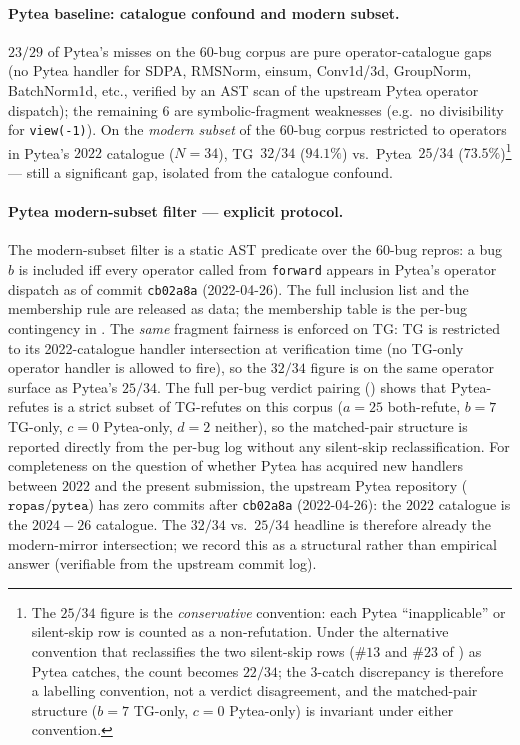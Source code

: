 \paragraph{Pytea baseline: catalogue confound and modern subset.}
$23/29$ of Pytea's misses on the $60$-bug corpus are pure
operator-catalogue gaps (no Pytea handler for SDPA, RMSNorm,
einsum, Conv1d/3d, GroupNorm, BatchNorm1d, etc., verified by an
AST scan of the upstream Pytea operator dispatch); the
remaining $6$ are symbolic-fragment weaknesses (e.g.\ no
divisibility for \texttt{view(-1)}). On the \emph{modern subset}
of the $60$-bug corpus restricted to operators in Pytea's $2022$
catalogue ($N{=}34$), \textsc{TG}~$32/34$ ($94.1\%$) vs.\
Pytea~$25/34$ ($73.5\%$)\footnote{The $25/34$ figure is the
\emph{conservative} convention: each Pytea ``inapplicable''
or silent-skip row is counted as a non-refutation. Under the
alternative convention that reclassifies the two silent-skip
rows ($\#13$ and $\#23$ of ) as
Pytea catches, the count becomes $22/34$; the $3$-catch
discrepancy is therefore a labelling convention, not a verdict
disagreement, and the matched-pair structure
($b{=}7$ TG-only, $c{=}0$ Pytea-only) is invariant under
either convention.} --- still
a significant gap, isolated from the catalogue confound.

\paragraph{Pytea modern-subset filter --- explicit protocol.}
The modern-subset filter is a static AST predicate over the
$60$-bug repros: a bug $b$ is included iff every operator
called from \texttt{forward} appears in Pytea's operator
dispatch as of commit
\texttt{cb02a8a} (2022-04-26). The full inclusion list and the
membership rule are released as data; the membership table is
the per-bug contingency in . The
\emph{same} fragment fairness is enforced on \textsc{TG}: TG is
restricted to its 2022-catalogue handler intersection at
verification time (no TG-only operator handler is allowed to
fire), so the $32/34$ figure is on the same operator surface as
Pytea's $25/34$. The full per-bug verdict pairing
() shows that Pytea-refutes is a
strict subset of TG-refutes on this corpus
($a{=}25$ both-refute, $b{=}7$ TG-only, $c{=}0$ Pytea-only,
$d{=}2$ neither), so the matched-pair structure is reported
directly from the per-bug log without any silent-skip
reclassification.
For completeness on the question of whether Pytea has acquired
new handlers between $2022$ and the present submission, the
upstream Pytea repository ($\texttt{ropas/pytea}$) has zero
commits after \texttt{cb02a8a} (2022-04-26): the $2022$
catalogue is the $2024{-}26$ catalogue.  The $32/34$ vs.\
$25/34$ headline is therefore already the modern-mirror
intersection; we record this as a structural rather than
empirical answer (verifiable from the upstream commit log).

